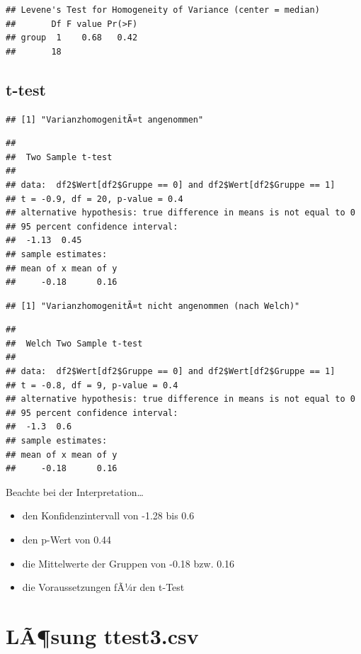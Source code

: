 \documentclass[
]{book}
\providecommand{\tightlist}{%
  \setlength{\itemsep}{0pt}\setlength{\parskip}{0pt}}
\begin{document}
\begin{verbatim}
## Levene's Test for Homogeneity of Variance (center = median)
##       Df F value Pr(>F)
## group  1    0.68   0.42
##       18
\end{verbatim}

\hypertarget{t-test}{%
\subsection{t-test}\label{t-test}}

\begin{verbatim}
## [1] "VarianzhomogenitÃ¤t angenommen"
\end{verbatim}

\begin{verbatim}
## 
##  Two Sample t-test
## 
## data:  df2$Wert[df2$Gruppe == 0] and df2$Wert[df2$Gruppe == 1]
## t = -0.9, df = 20, p-value = 0.4
## alternative hypothesis: true difference in means is not equal to 0
## 95 percent confidence interval:
##  -1.13  0.45
## sample estimates:
## mean of x mean of y 
##     -0.18      0.16
\end{verbatim}

\begin{verbatim}
## [1] "VarianzhomogenitÃ¤t nicht angenommen (nach Welch)"
\end{verbatim}

\begin{verbatim}
## 
##  Welch Two Sample t-test
## 
## data:  df2$Wert[df2$Gruppe == 0] and df2$Wert[df2$Gruppe == 1]
## t = -0.8, df = 9, p-value = 0.4
## alternative hypothesis: true difference in means is not equal to 0
## 95 percent confidence interval:
##  -1.3  0.6
## sample estimates:
## mean of x mean of y 
##     -0.18      0.16
\end{verbatim}

Beachte bei der Interpretation\ldots{}

\begin{itemize}
\tightlist
\item
  den Konfidenzintervall von -1.28 bis 0.6
\item
  den p-Wert von 0.44
\item
  die Mittelwerte der Gruppen von -0.18 bzw. 0.16
\item
  die Voraussetzungen fÃ¼r den t-Test
\end{itemize}

\hypertarget{luxe3sung-ttest3.csv}{%
\section{LÃ¶sung ttest3.csv}\label{luxe3sung-ttest3.csv}}
\end{document}
